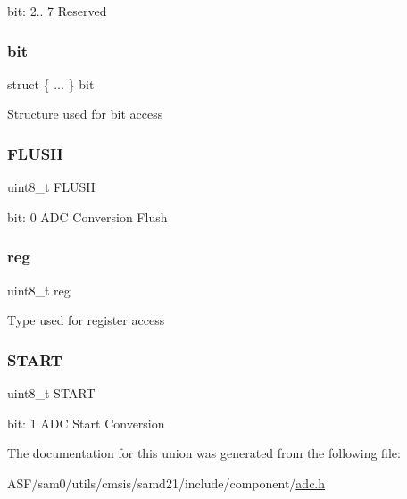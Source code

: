 bit\+: 2.. 7 Reserved \mbox{\label{union_a_d_c___s_w_t_r_i_g___type_ae1f3c80a83e7c06c1f8551cbdbfed012}} 
\subsubsection{\texorpdfstring{bit}{bit}}
{\footnotesize\ttfamily struct \{ ... \}   bit}

Structure used for bit access \mbox{\label{union_a_d_c___s_w_t_r_i_g___type_a30d3dfffaf367adc608d208bdba93fb9}} 
\subsubsection{\texorpdfstring{FLUSH}{FLUSH}}
{\footnotesize\ttfamily uint8\+\_\+t F\+L\+U\+SH}

bit\+: 0 A\+DC Conversion Flush \mbox{\label{union_a_d_c___s_w_t_r_i_g___type_a9428adc9af4653a2050e2536b55dec8d}} 
\subsubsection{\texorpdfstring{reg}{reg}}
{\footnotesize\ttfamily uint8\+\_\+t reg}

Type used for register access \mbox{\label{union_a_d_c___s_w_t_r_i_g___type_acd48c87f8808fb311a0f7e2c6159bc59}} 
\subsubsection{\texorpdfstring{START}{START}}
{\footnotesize\ttfamily uint8\+\_\+t S\+T\+A\+RT}

bit\+: 1 A\+DC Start Conversion 

The documentation for this union was generated from the following file\+:\begin{DoxyCompactItemize}
\item 
A\+S\+F/sam0/utils/cmsis/samd21/include/component/\mbox{\hyperlink{component_2adc_8h}{adc.\+h}}\end{DoxyCompactItemize}
